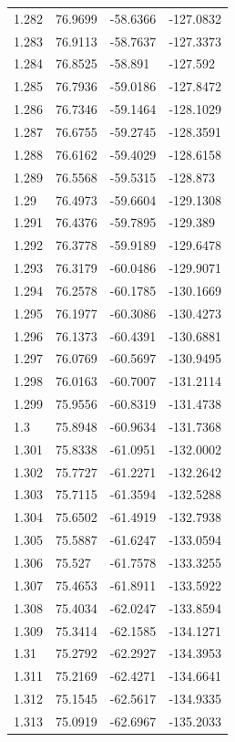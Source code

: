 \begin{tabular}{llll}
1.282 & 76.9699 & -58.6366 & -127.0832 \\
1.283 & 76.9113 & -58.7637 & -127.3373 \\
1.284 & 76.8525 & -58.891 & -127.592 \\
1.285 & 76.7936 & -59.0186 & -127.8472 \\
1.286 & 76.7346 & -59.1464 & -128.1029 \\
1.287 & 76.6755 & -59.2745 & -128.3591 \\
1.288 & 76.6162 & -59.4029 & -128.6158 \\
1.289 & 76.5568 & -59.5315 & -128.873 \\
1.29 & 76.4973 & -59.6604 & -129.1308 \\
1.291 & 76.4376 & -59.7895 & -129.389 \\
1.292 & 76.3778 & -59.9189 & -129.6478 \\
1.293 & 76.3179 & -60.0486 & -129.9071 \\
1.294 & 76.2578 & -60.1785 & -130.1669 \\
1.295 & 76.1977 & -60.3086 & -130.4273 \\
1.296 & 76.1373 & -60.4391 & -130.6881 \\
1.297 & 76.0769 & -60.5697 & -130.9495 \\
1.298 & 76.0163 & -60.7007 & -131.2114 \\
1.299 & 75.9556 & -60.8319 & -131.4738 \\
1.3 & 75.8948 & -60.9634 & -131.7368 \\
1.301 & 75.8338 & -61.0951 & -132.0002 \\
1.302 & 75.7727 & -61.2271 & -132.2642 \\
1.303 & 75.7115 & -61.3594 & -132.5288 \\
1.304 & 75.6502 & -61.4919 & -132.7938 \\
1.305 & 75.5887 & -61.6247 & -133.0594 \\
1.306 & 75.527 & -61.7578 & -133.3255 \\
1.307 & 75.4653 & -61.8911 & -133.5922 \\
1.308 & 75.4034 & -62.0247 & -133.8594 \\
1.309 & 75.3414 & -62.1585 & -134.1271 \\
1.31 & 75.2792 & -62.2927 & -134.3953 \\
1.311 & 75.2169 & -62.4271 & -134.6641 \\
1.312 & 75.1545 & -62.5617 & -134.9335 \\
1.313 & 75.0919 & -62.6967 & -135.2033 \\

\end{tabular}
